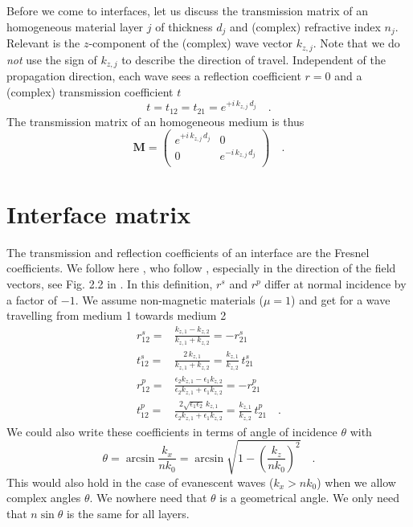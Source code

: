 Before we come to interfaces, let us discuss the transmission matrix of an homogeneous material layer $j$ of thickness $d_j$ and (complex) refractive index $n_j$. Relevant is the $z$-component of the (complex) wave vector $k_{z,j}$. Note that we do \emph{not} use the sign of  $k_{z,j}$ to describe the direction of travel.
Independent of the propagation direction, each wave sees a reflection coefficient $r=0$ and a (complex) transmission coefficient $t$
\begin{equation}
t = t_{12} = t_{21} = e^{+ i \, k_{z,j} \, d_j } \quad . 
\end{equation}
The transmission matrix of an homogeneous medium is thus
\begin{equation}
\mathbf{M} = 
\begin{pmatrix}
e^{+i \, k_{z,j} \, d_j } & 0 \\0 & e^{-i \, k_{z,j} \, d_j } \\
\end{pmatrix} \quad . 
\label{eq:M_prob}
\end{equation}


\section{Interface matrix}

The transmission and reflection coefficients of an interface are the Fresnel coefficients. We follow here \cite{Novotny-Hecht2012}, who follow \cite{BornWolf2002}, especially in the direction of the field vectors, see Fig. 2.2 in \cite{Novotny-Hecht2012}. In this definition,  $r^s$ and $r^p$ differ at normal incidence by a factor of $-1$. We assume non-magnetic materials ($\mu = 1$) and get for a wave travelling from medium 1 towards medium 2
\begin{align}
 r_{12}^s = & \frac{k_{z,1} - k_{z,2}}{k_{z,1} + k_{z,2}}  = - r_{21}^s\\
 t_{12}^s = & \frac{2 \, k_{z,1}}{k_{z,1} + k_{z,2}} =  \frac{k_{z,1}}{k_{z,2}}  \,  t_{21}^s\\
  r_{12}^p = & \frac{\epsilon_2	 k_{z,1} - \epsilon_1 k_{z,2}}
				  {\epsilon_2 k_{z,1} + \epsilon_1 k_{z,2}}  = - r_{21}^p\\
  t_{12}^p = & \frac{2 \sqrt{\epsilon_1 \epsilon_2}	 \,k_{z,1} }
				  {\epsilon_2 k_{z,1} + \epsilon_1 k_{z,2}}  = \frac{k_{z,1}}{k_{z,2}}  \,  t_{21}^p \quad . 
\end{align}
We could also write these coefficients in terms of angle of incidence $\theta$ with
\begin{equation}
 \theta = \arcsin \frac{k_x}{n k_0} = \arcsin \sqrt{1 - \left( \frac{k_z}{n k_0} \right)^2 } \quad . 
\end{equation}
This would also hold in the case of evanescent waves ($k_x > n k_0$) when we allow complex angles $\theta$. We nowhere need that $\theta$ is a geometrical angle. We only need that $n \sin \theta$ is the same for all layers.


